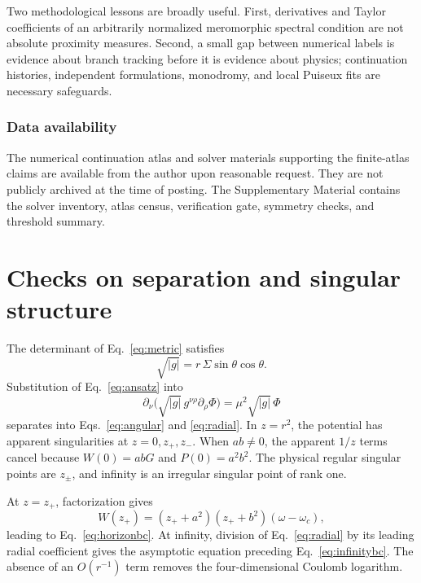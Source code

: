 \documentclass[10pt]{article}
\theoremstyle{plain}
\begin{document}
Two methodological lessons are broadly useful. First, derivatives and Taylor
coefficients of an arbitrarily normalized meromorphic spectral condition are
not absolute proximity measures. Second, a small gap between numerical labels is
evidence about branch tracking before it is evidence about physics;
continuation histories, independent formulations, monodromy, and local Puiseux
fits are necessary safeguards.

\subsubsection*{Data availability}

The numerical continuation atlas and solver materials supporting the
finite-atlas claims are available from the author upon reasonable request.
They are not publicly archived at the time of posting. The Supplementary
Material contains the solver inventory, atlas census, verification gate,
symmetry checks, and threshold summary.




\appendix

\section{Checks on separation and singular structure}

The determinant of Eq.~\eqref{eq:metric} satisfies
\begin{equation}
\sqrt{|g|}=r\,\Sigma\sin\theta\cos\theta .
\end{equation}
Substitution of Eq.~\eqref{eq:ansatz} into
\begin{equation}
\partial_\nu\bigl(\sqrt{|g|}\,g^{\nu\rho}\partial_\rho\Phi\bigr)
=\mu^2\sqrt{|g|}\,\Phi
\end{equation}
separates into Eqs.~\eqref{eq:angular} and \eqref{eq:radial}. In $z=r^2$, the
potential has apparent singularities at $z=0,z_+,z_-$. When $ab\neq0$, the
apparent $1/z$ terms cancel because $W(0)=abG$ and $P(0)=a^2b^2$. The physical
regular singular points are $z_\pm$, and infinity is an irregular singular point
of rank one.

At $z=z_+$, factorization gives
\begin{equation}
W(z_+)=(z_++a^2)(z_++b^2)(\omega-\omega_c),
\end{equation}
leading to Eq.~\eqref{eq:horizonbc}. At infinity, division of
Eq.~\eqref{eq:radial} by its leading radial coefficient gives the asymptotic
equation preceding Eq.~\eqref{eq:infinitybc}. The absence of an $O(r^{-1})$ term
removes the four-dimensional Coulomb logarithm.
\end{document}
